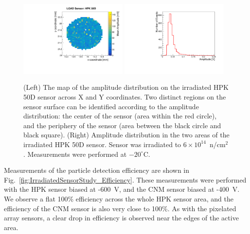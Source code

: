 \documentclass[preprint,1p]{elsarticle}
\begin{document}
\begin{figure}[htbp] 
\centering
\includegraphics[width=0.48\textwidth]{figs/USCSBoard_HPK50DIrradiated-CNMW11LGA35_Run936-961/HPK_irradiated_amp_Map.pdf} \hfill
\includegraphics[width=0.48\textwidth]{figs/USCSBoard_HPK50DIrradiated-CNMW11LGA35_Run936-961/HPK_irradiated_amp_1D.pdf} 
\caption{(Left) The map of the amplitude distribution on the irradiated HPK 50D sensor across X and Y coordinates. Two distinct regions on the sensor surface can be identified according to the amplitude distribution: the center of the sensor (area within the red circle), and the periphery of the sensor (area between the black circle and black square). (Right) Amplitude distribution in the two areas of the irradiated HPK 50D sensor. Sensor was irradiated to $6\times 10^{14}$~n/cm$^2$. Measurements were performed at $-20^{\circ}$C.} 
\label{fig:HPK_irradiated_amp_Map} 
\end{figure} 

Measurements of the particle detection efficiency are shown in
Fig.~\ref{fig:IrradiatedSensorStudy_Efficiency}. These measurements were
performed with the HPK sensor biased at -600~V, and the CNM sensor biased at
-400~V. We observe a flat 100\% efficiency across the whole HPK sensor area, and
the efficiency of the CNM sensor is also very close to 100\%. As with the
pixelated array sensors, a clear drop in efficiency is observed near the edges
of the active area. 
\end{document}
